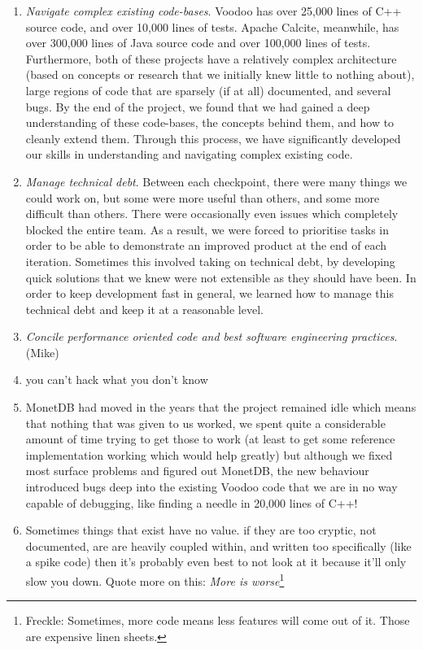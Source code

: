 \begin{enumerate}
\item \emph{Navigate complex existing code-bases}. Voodoo has over 25,000 lines of C++ source code, and over 10,000 lines of tests. Apache Calcite, meanwhile, has over 300,000 lines of Java source code and over 100,000 lines of tests. Furthermore, both of these projects have a relatively complex architecture (based on concepts or research that we initially knew little to nothing about), large regions of code that are sparsely (if at all) documented, and several bugs. By the end of the project, we found that we had gained a deep understanding of these code-bases, the concepts behind them, and how to cleanly extend them. Through this process, we have significantly developed our skills in understanding and navigating complex existing code.

\item \emph{Manage technical debt}. Between each checkpoint, there were many things we could work on, but some were more useful than others, and some more difficult than others. There were occasionally even issues which completely blocked the entire team. As a result, we were forced to prioritise tasks in order to be able to demonstrate an improved product at the end of each iteration. Sometimes this involved taking on technical debt, by developing quick solutions that we knew were not extensible as they should have been. In order to keep development fast in general, we learned how to manage this technical debt and keep it at a reasonable level.

\item \emph{Concile performance oriented code and best software engineering practices}. (Mike) \item you can't hack what you don't know
\item MonetDB had moved in the years that the project remained idle which means that nothing that was given to us worked, we spent quite a considerable amount of time trying to get those to work (at least to get some reference implementation working which would help greatly) but although we fixed most surface problems and figured out MonetDB, the new behaviour introduced bugs deep into the existing Voodoo code that we are in no way capable of debugging, like finding a needle in 20,000 lines of C++!
\item Sometimes things that exist have no value. if they are too cryptic, not documented, are are heavily coupled within, and written too specifically (like a spike code) then it's probably even best to not look at it because it'll only slow you down. Quote more on this: \emph{More is worse}\footnote{Freckle: Sometimes, more code means less features will come out of it. Those are expensive linen sheets.}


\end{enumerate}
